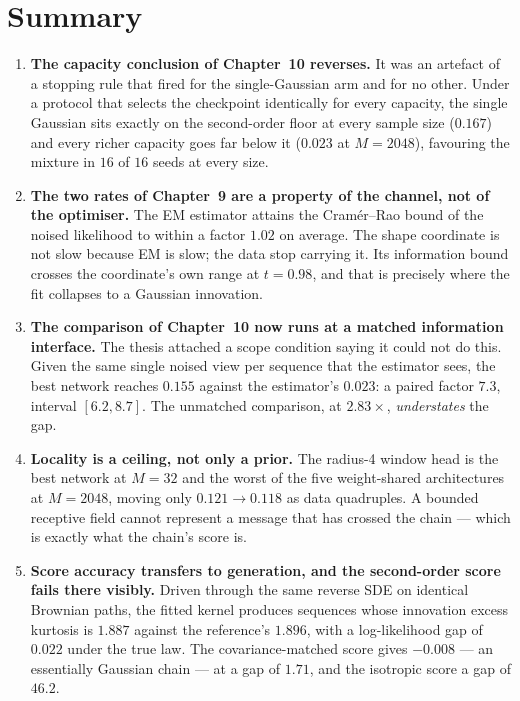 \documentclass[11pt,a4paper]{article}
\newcommand{\hi}[1]{\textbf{#1}}
\begin{document}
\section{Summary}\label{sec:summary}

\begin{enumerate}
\item \hi{The capacity conclusion of Chapter~10 reverses.} It was an artefact of a stopping rule
that fired for the single-Gaussian arm and for no other. Under a protocol that selects the
checkpoint identically for every capacity, the single Gaussian sits exactly on the second-order
floor at every sample size ($0.167$) and every richer capacity goes far below it ($0.023$ at
$M=2048$), favouring the mixture in $16$ of $16$ seeds at every size.

\item \hi{The two rates of Chapter~9 are a property of the channel, not of the optimiser.} The EM
estimator attains the Cram\'er--Rao bound of the noised likelihood to within a factor $1.02$ on
average. The shape coordinate is not slow because EM is slow; the data stop carrying it. Its
information bound crosses the coordinate's own range at $t=0.98$, and that is precisely where the
fit collapses to a Gaussian innovation.

\item \hi{The comparison of Chapter~10 now runs at a matched information interface.} The thesis
attached a scope condition saying it could not do this. Given the same single noised view per
sequence that the estimator sees, the best network reaches $0.155$ against the estimator's
$0.023$: a paired factor $7.3$, interval $[6.2,8.7]$. The unmatched comparison, at $2.83\times$,
\emph{understates} the gap.

\item \hi{Locality is a ceiling, not only a prior.} The radius-4 window head is the best network at
$M=32$ and the worst of the five weight-shared architectures at $M=2048$, moving only
$0.121\rightarrow0.118$ as data quadruples. A bounded receptive field cannot represent a message
that has crossed the chain --- which is exactly what the chain's score is.

\item \hi{Score accuracy transfers to generation, and the second-order score fails there
visibly.} Driven through the same reverse SDE on identical Brownian paths, the fitted kernel
produces sequences whose innovation excess kurtosis is $1.887$ against the reference's $1.896$,
with a log-likelihood gap of $0.022$ under the true law. The covariance-matched score gives
$-0.008$ --- an essentially Gaussian chain --- at a gap of $1.71$, and the isotropic score a gap of
$46.2$.


\end{enumerate}
\end{document}
